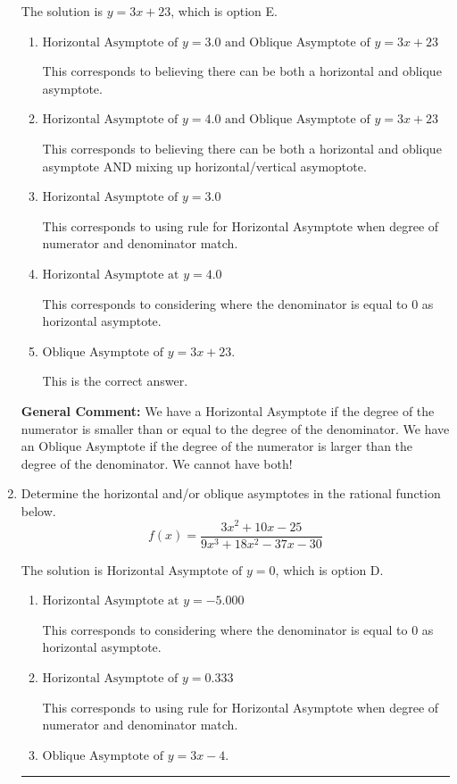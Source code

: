 \documentclass{extbook}[14pt]
\newcommand{\litem}[1]{\item #1

\rule{\textwidth}{0.4pt}}
\begin{document}
\begin{enumerate}
{The solution is \( y = 3x + 23 \), which is option E.\begin{enumerate}[label=\Alph*.]
\item \( \text{Horizontal Asymptote of } y = 3.0 \text{ and Oblique Asymptote of } y = 3x + 23 \)

This corresponds to believing there can be both a horizontal and oblique asymptote.
\item \( \text{Horizontal Asymptote of } y = 4.0 \text{ and Oblique Asymptote of } y = 3x + 23 \)

This corresponds to believing there can be both a horizontal and oblique asymptote AND mixing up horizontal/vertical asymoptote.
\item \( \text{Horizontal Asymptote of } y = 3.0  \)

This corresponds to using rule for Horizontal Asymptote when degree of numerator and denominator match.
\item \( \text{Horizontal Asymptote at } y = 4.0 \)

This corresponds to considering where the denominator is equal to 0 as horizontal asymptote.
\item \( \text{Oblique Asymptote of } y = 3x + 23. \)

This is the correct answer.
\end{enumerate}

\textbf{General Comment:} We have a Horizontal Asymptote if the degree of the numerator is smaller than or equal to the degree of the denominator. We have an Oblique Asymptote if the degree of the numerator is larger than the degree of the denominator. We cannot have both!
}
\litem{
Determine the horizontal and/or oblique asymptotes in the rational function below.
\[ f(x) = \frac{3x^{2} +10 x -25}{9x^{3} +18 x^{2} -37 x -30} \]

The solution is \( \text{Horizontal Asymptote of } y = 0 \), which is option D.\begin{enumerate}[label=\Alph*.]
\item \( \text{Horizontal Asymptote at } y = -5.000 \)

This corresponds to considering where the denominator is equal to 0 as horizontal asymptote.
\item \( \text{Horizontal Asymptote of } y = 0.333  \)

This corresponds to using rule for Horizontal Asymptote when degree of numerator and denominator match.
\item \( \text{Oblique Asymptote of } y = 3x -4. \)


\end{enumerate}}
\end{enumerate}
\end{document}
